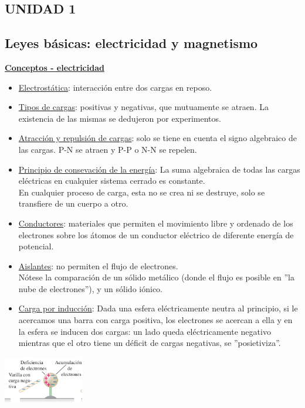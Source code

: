 \documentclass[a4paper]{article}
\begin{document}
\begin{multicols}{2}
    \section{UNIDAD 1}
        \subsection{Leyes básicas: electricidad y magnetismo}
            \textbf{\underline{Conceptos - electricidad}} \\
                \begin{itemize}
                    \item \underline{Electrostática}: interacción entre dos cargas en reposo. \\
                    \item \underline{Tipos de cargas}: positivas y negativas, que mutuamente se atraen. La existencia de las mismas se dedujeron por experimentos. \\
                    \item \underline{Atracción y repulsión de cargas}: solo se tiene en cuenta el signo algebraico de las cargas. P-N se atraen y P-P o N-N se repelen. \\
                    \item \underline{Principio de consevación de la energía}: La suma algebraica de todas las cargas eléctricas en cualquier sistema cerrado es constante. \\
                        \indent En cualquier proceso de carga, esta no se crea ni se destruye, solo se transfiere de un cuerpo a otro. \\
                    \item \underline{Conductores}: materiales que permiten el movimiento libre y ordenado de los electrones sobre los átomos de un conductor eléctrico de diferente energía de potencial. \\
                    \item \underline{Aislantes}: no permiten el flujo de electrones. \\
                        \indent Nótese la comparación de un sólido metálico (donde el flujo es posible en ''la nube de electrones''), y un sólido iónico. \\
                    \item \underline{Carga por inducción}: Dada una esfera eléctricamente neutra al principio, si le acercamos una barra con carga positiva, los electrones se acercan a ella y en la esfera se inducen dos cargas: un lado queda eléctricamente negativo mientras que el otro tiene un déficit de cargas negativas, se ''posietiviza''.
                \end{itemize}
                \begin{center} \includegraphics[width=3.5cm]{../imagenes/esferaInduccion.png} \end{center}


\end{multicols}
\end{document}
